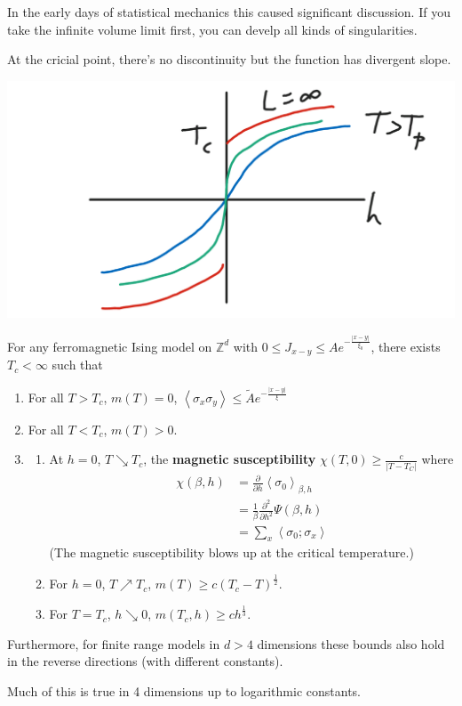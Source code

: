 \documentclass[12pt]{book}
\theoremstyle{norm}
\begin{document}

In the early days of statistical mechanics this caused significant discussion. If you take the infinite volume limit first, you can develp all kinds of singularities.

At the cricial point, there's no discontinuity but the function has divergent slope. 

\begin{center}\includegraphics[scale=.25]{images/4-26-2}\end{center}

\begin{theorem}
For any ferromagnetic Ising model on $\mathbb{Z}^d$ with $0 \le J_{x-y} \le Ae^{-\frac{|x-y|}{\xi_0}}$, there exists $T_c<\infty$ such that 
\begin{enumerate}
\item
For all $T>T_c$, $m(T)=0$, $\left\langle {\sigma_x\sigma_y}\right\rangle\le \widetilde{A} e^{-\frac{|x-y|}{\xi}}$
\item
For all $T<T_c$, $m(T)>0$. 
\item
\begin{enumerate}
\item
At $h=0$, $T\searrow T_c$, the \textbf{magnetic susceptibility} $\chi(T,0)\ge \frac{c}{|T-T_C|}$ where 
\begin{align}
\chi(\beta,h) &= \frac{\partial}{\partial h} \left\langle {\sigma_0}\right\rangle_{\beta, h} \\
&=\frac{1}{\beta}\frac{\partial^2 }{\partial {h}^2}\Psi(\beta, h)\\
&=\sum_x \left\langle {\sigma_0;\sigma_x}\right\rangle
\end{align}
(The {magnetic susceptibility} blows up at the critical temperature.)
\item
For $h=0$, $T\nearrow T_c$, $m(T) \ge c(T_c-T)^{\frac{1}{2}}$.
\item
For $T=T_c$, $h\searrow 0$, $m(T_c,h) \ge ch^{\frac{1}{3}}$.
\end{enumerate}
\end{enumerate}
Furthermore, for finite range models in $d>4$ dimensions these bounds also hold in the reverse directions (with different constants).
\end{theorem}
Much of this is true in 4 dimensions up to logarithmic constants.
\end{document}
